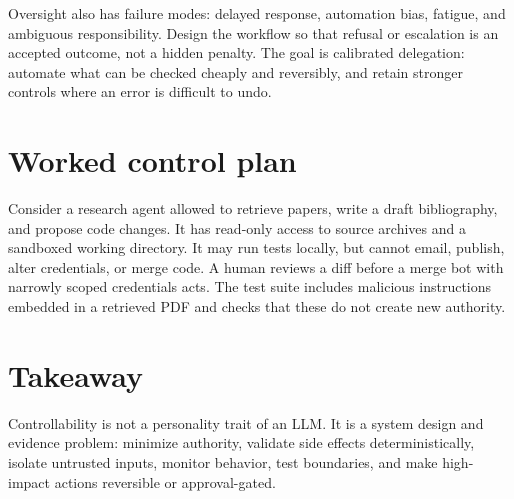 \documentclass[11pt]{article}\usepackage[margin=1in]{geometry}\usepackage[T1]{fontenc}\usepackage{lmodern,microtype,hyperref,enumitem}\hypersetup{colorlinks=true,urlcolor=blue,citecolor=blue,linkcolor=blue}
\begin{document}
Oversight also has failure modes: delayed response, automation bias, fatigue, and ambiguous responsibility. Design the workflow so that refusal or escalation is an accepted outcome, not a hidden penalty. The goal is calibrated delegation: automate what can be checked cheaply and reversibly, and retain stronger controls where an error is difficult to undo.
\section{Worked control plan}
Consider a research agent allowed to retrieve papers, write a draft bibliography, and propose code changes. It has read-only access to source archives and a sandboxed working directory. It may run tests locally, but cannot email, publish, alter credentials, or merge code. A human reviews a diff before a merge bot with narrowly scoped credentials acts. The test suite includes malicious instructions embedded in a retrieved PDF and checks that these do not create new authority.
\section{Takeaway}Controllability is not a personality trait of an LLM. It is a system design and evidence problem: minimize authority, validate side effects deterministically, isolate untrusted inputs, monitor behavior, test boundaries, and make high-impact actions reversible or approval-gated.
\end{document}
